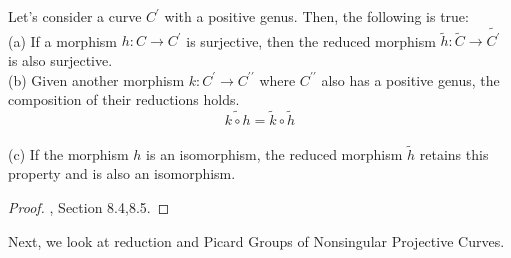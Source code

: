 \begin{corollary}
Let's consider a curve \( C^{\prime} \) with a positive genus. Then, the following is true:\\
   (a) If a morphism \( h: C \longrightarrow C^{\prime} \) is surjective, then the reduced morphism \( \tilde{h}: \widetilde{C} \longrightarrow \widetilde{C^{\prime}} \) is also surjective.\\
   (b) Given another morphism \( k: C^{\prime} \longrightarrow C^{\prime \prime} \) where \( C^{\prime \prime} \) also has a positive genus, the composition of their reductions holds.
   \[
   \widetilde{k \circ h} = \widetilde{k} \circ \widetilde{h}
   \]\\
   (c) If the morphism \( h \) is an isomorphism, the reduced morphism \( \tilde{h} \) retains this property and is also an isomorphism.
\begin{proof}
\cite{diamond2005first}, Section 8.4,8.5. 
    
\end{proof}

\end{corollary}
Next, we look at reduction and Picard Groups of Nonsingular Projective Curves.
